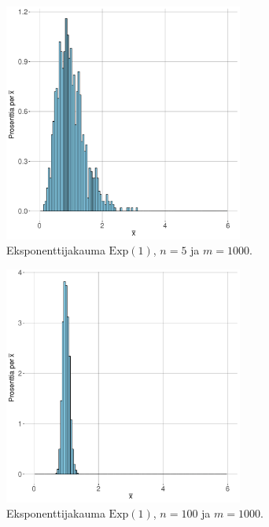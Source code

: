 \documentclass{beamer}
\begin{document}

\begin{frame}
  \begin{center}
    \begin{figure}
      \includegraphics[width=0.7\textwidth, height=0.7\textwidth]{exp-n-5.pdf}
      \caption{Eksponenttijakauma $\mathrm{Exp}\left(1\right)$, $n = 5$ ja $m = 1000$.}
  \end{figure}
\end{center}
\end{frame}


\begin{frame}
  \begin{center}
    \begin{figure}
      \includegraphics[width=0.7\textwidth, height=0.7\textwidth]{exp-n-100.pdf}
      \caption{Eksponenttijakauma $\mathrm{Exp}\left(1\right)$, $n = 100$ ja $m = 1000$.}
  \end{figure}
\end{center}
\end{frame}
\end{document}
